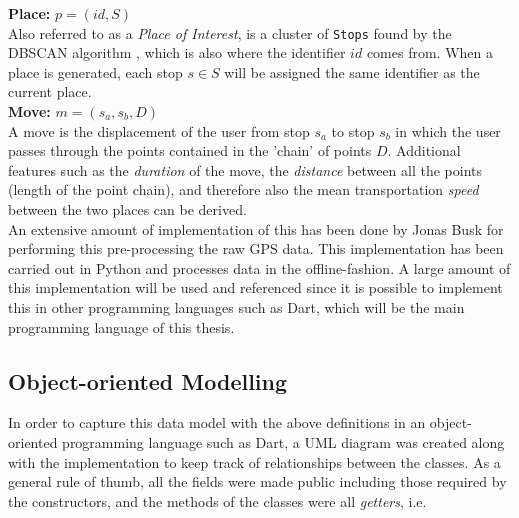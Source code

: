\textbf{Place:} $p = (id, S)$\\
Also referred to as a \textit{Place of Interest}, is a cluster of \verb|Stops| found by the DBSCAN algorithm \cite{density-based-1996}, which is also where the identifier $id$ comes from. When a place is generated, each stop $s \in S$ will be assigned the same identifier as the current place.\\

\textbf{Move:} $m = (s_a, s_b, D)$\\
A move is the displacement of the user from stop $s_a$ to stop $s_b$ in which the user passes through the points contained in the 'chain' of points $D$. Additional features such as the \textit{duration} of the move, the \textit{distance} between all the points (length of the point chain), and therefore also the mean transportation \textit{speed} between the two places can be derived.\\
An extensive amount of implementation of this has been done by Jonas Busk for performing this pre-processing the raw GPS data. This implementation has been carried out in Python and processes data in the offline-fashion. A large amount of this implementation will be used and referenced since it is possible to implement this in other programming languages such as Dart, which will be the main programming language of this thesis.

\subsection{Object-oriented Modelling}
In order to capture this data model with the above definitions in an object-oriented programming language such as Dart, a UML diagram was created along with the implementation to keep track of relationships between the classes. As a general rule of thumb, all the fields were made public including those required by the constructors, and the methods of the classes were all \textit{getters}, i.e. 

